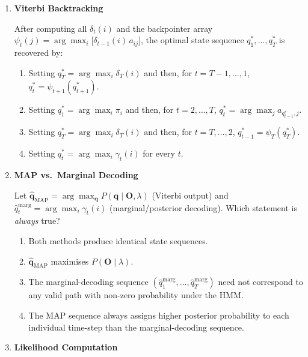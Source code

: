 \documentclass[12pt]{article}
\begin{document}
\begin{enumerate}[label=\textbf{Q\arabic*.}, leftmargin=*, itemsep=2em]
\item \textbf{Viterbi Backtracking}

After computing all $\delta_t(i)$ and the backpointer array
$\psi_t(j) = \arg\max_i\bigl[\delta_{t-1}(i)\, a_{ij}\bigr]$,
the optimal state sequence $q_1^*,\dots,q_T^*$ is recovered by:

\begin{enumerate}[label=\Alph*.]
    \item Setting $q_T^* = \arg\max_i \delta_T(i)$ and then,
          for $t = T-1, \dots, 1$, $q_t^* = \psi_{t+1}(q_{t+1}^*)$.
    \item Setting $q_1^* = \arg\max_i \pi_i$ and then,
          for $t = 2, \dots, T$, $q_t^* = \arg\max_j a_{q_{t-1}^*,j}$.
    \item Setting $q_T^* = \arg\max_i \delta_T(i)$ and then,
          for $t = T, \dots, 2$, $q_{t-1}^* = \psi_T(q_T^*)$.
    \item Setting $q_t^* = \arg\max_i \gamma_t(i)$ for every $t$.
\end{enumerate}

\item \textbf{MAP vs.\ Marginal Decoding}

Let $\hat{\mathbf{q}}_{\text{MAP}} = \arg\max_{\mathbf{q}} P(\mathbf{q}\mid\mathbf{O},\lambda)$
(Viterbi output) and $\hat{q}_t^{\text{marg}} = \arg\max_i \gamma_t(i)$
(marginal/posterior decoding). Which statement is \emph{always} true?

\begin{enumerate}[label=\Alph*.]
    \item Both methods produce identical state sequences.
    \item $\hat{\mathbf{q}}_{\text{MAP}}$ maximises $P(\mathbf{O}\mid\lambda)$.
    \item The marginal-decoding sequence $(\hat{q}_1^{\text{marg}},\dots,\hat{q}_T^{\text{marg}})$
          need not correspond to any valid path with non-zero probability under the HMM.
    \item The MAP sequence always assigns higher posterior probability to each individual
          time-step than the marginal-decoding sequence.
\end{enumerate}

\item \textbf{Likelihood Computation}


\end{enumerate}
\end{document}
